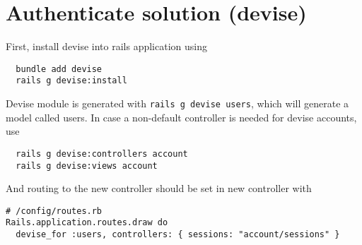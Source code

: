 \section{Authenticate solution (devise)}

First, install devise into rails application using
\begin{verbatim}
  bundle add devise
  rails g devise:install
\end{verbatim}

Devise module is generated with \texttt{rails g devise users}, which will generate a model called users.
In case a non-default controller is needed for devise accounts, use
\begin{verbatim}
  rails g devise:controllers account
  rails g devise:views account
\end{verbatim}

And routing to the new controller should be set in new controller with
\begin{verbatim}
# /config/routes.rb
Rails.application.routes.draw do
  devise_for :users, controllers: { sessions: "account/sessions" }
\end{verbatim}


\printbibliography[heading=Links]
